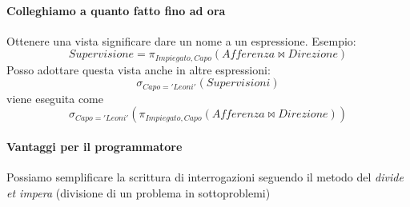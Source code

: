 \paragraph{Colleghiamo a quanto fatto fino ad ora} Ottenere una vista significare dare un nome a un espressione. Esempio:
\[Supervisione = \pi_{Impiegato,Capo}(Afferenza \Join Direzione)\]
Posso adottare questa vista anche in altre espressioni:
\[\sigma_{Capo='Leoni'}(Supervisioni)\]
viene eseguita come
\[\sigma_{Capo='Leoni'}(\pi_{Impiegato,Capo}(Afferenza \Join Direzione))\]
\paragraph{Vantaggi per il programmatore} Possiamo semplificare la scrittura di interrogazioni seguendo il metodo del \emph{divide et impera} (divisione di un problema in sottoproblemi)